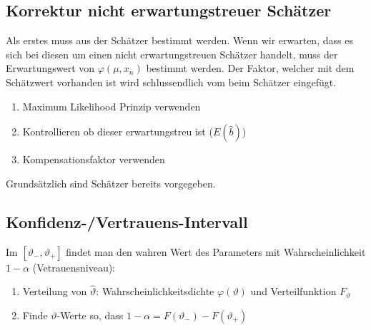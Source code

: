\documentclass[../Main.tex]{subfiles}
\begin{document}

\subsection{Korrektur nicht erwartungstreuer Schätzer}
Als erstes muss aus der Schätzer bestimmt werden. Wenn wir erwarten, dass
es sich bei diesen um einen nicht erwartungstreuen Schätzer handelt, muss
der Erwartungswert von \(\varphi(\mu,x_n)\) bestimmt werden. Der Faktor,
welcher mit dem Schätzwert vorhanden ist wird schlussendlich vom beim 
Schätzer eingefügt.
\begin{enumerate}
    \item Maximum Likelihood Prinzip verwenden
    \item Kontrollieren ob dieser erwartungstreu ist (\(E(\hat{b})\))
    \item Kompensationsfaktor verwenden
\end{enumerate}
Grundsätzlich sind Schätzer bereits vorgegeben.

\subsection{Konfidenz-/Vertrauens-Intervall}
Im \([\vartheta_-,\vartheta_+]\) findet man den wahren Wert des
Parameters mit Wahrscheinlichkeit \(1-\alpha\) (Vetrauensniveau):
\begin{enumerate}
    \item Verteilung von \(\hat{\vartheta}\): Wahrscheinlichkeitsdichte
    \(\varphi(\vartheta)\) und Verteilfunktion \(F_\vartheta\)
    \item Finde \(\vartheta\)-Werte so, dass \(1-\alpha=F(\vartheta_-)-F(\vartheta_+)\)
\end{enumerate}
\end{document}
